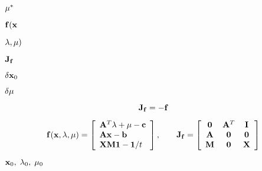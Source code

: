 {\newpage\clearpage
{}%
${\bf\mu}^*$%
\lthtmlinlinemathZ
\lthtmlcheckvsize\clearpage}

{\newpage\clearpage
{}%
${\bf f}({\bf x}$%
\lthtmlinlinemathZ
\lthtmlcheckvsize\clearpage}

{\newpage\clearpage
{}%
${\bf\lambda},{\bf\mu})$%
\lthtmlinlinemathZ
\lthtmlcheckvsize\clearpage}

{\newpage\clearpage
{}%
${\bf J}_{\bf f}$%
\lthtmlinlinemathZ
\lthtmlcheckvsize\clearpage}

{\newpage\clearpage
{}%
$\delta{\bf x}_0$%
\lthtmlinlinemathZ
\lthtmlcheckvsize\clearpage}

{\newpage\clearpage
{}%
$\delta{\bf\mu}$%
\lthtmlinlinemathZ
\lthtmlcheckvsize\clearpage}

{\newpage\clearpage
{}%
\begin{displaymath}
{\bf J}_{\bf f} =-{\bf f}
\end{displaymath}%
\lthtmldisplayZ
\lthtmlcheckvsize\clearpage}

{\newpage\clearpage
{}%
\begin{displaymath}
{\bf f}({\bf x},{\bf\lambda},{\bf\mu})=\left[\begin{array}{l}
{\bf A}^T{\bf\lambda}+{\bf\mu}-{\bf c}\\{\bf Ax}-{\bf b}\\
{\bf XM1}-{\bf 1}/t\end{array}\right],
\;\;\;\;\;\;\;
{\bf J}_{\bf f}=\left[\begin{array}{ccc}
{\bf0} & {\bf A}^T & {\bf I}\\{\bf A} & {\bf0} & {\bf0}\\
{\bf M} & {\bf0} & {\bf X}\end{array}\right]
\end{displaymath}%
\lthtmldisplayZ
\lthtmlcheckvsize\clearpage}

{\newpage\clearpage
{}%
${\bf x}_0,\;{\bf\lambda}_0,\;
{\bf\mu}_0$%
\lthtmlinlinemathZ
\lthtmlcheckvsize\clearpage}



